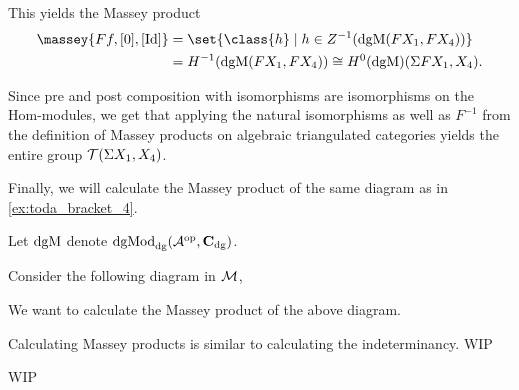 \begin{example}
    This yields the Massey product
    \begin{align*}
        \massey{F f, [0], [\Id]} &= \set{\class{ h } \mid h \in Z^{-1}(\dgM(F X_1, F X_4)) } \\
        &= H^{-1}(\dgM(F X_1, F X_4)) \cong H^0(\dgM)(\Sigma F X_1, X_4).
    \end{align*}

    Since pre and post composition with isomorphisms are isomorphisms on the Hom-modules, we get that applying the natural isomorphisms as well as \( F^{-1} \) from the definition of Massey products on algebraic triangulated categories yields the entire group \( {\mathcal{T}}(\Sigma X_1, X_4) \).
\end{example}

Finally, we will calculate the Massey product of the same diagram as in \autoref{ex:toda_bracket_4}.

\begin{example}
    Let \( \operatorname{dgM} \) denote \( \operatorname{dgMod}_{\operatorname{dg}}({\mathcal{A}}^{\operatorname{op}}, \operatorname{\mathbf{C}}_{\operatorname{dg}}) \).

    Consider the following diagram in \( {\mathcal{M}} \),
    \begin{center}
	\end{center}

    We want to calculate the Massey product of the above diagram.
\end{example}

Calculating Massey products is similar to calculating the indeterminancy. WIP

WIP